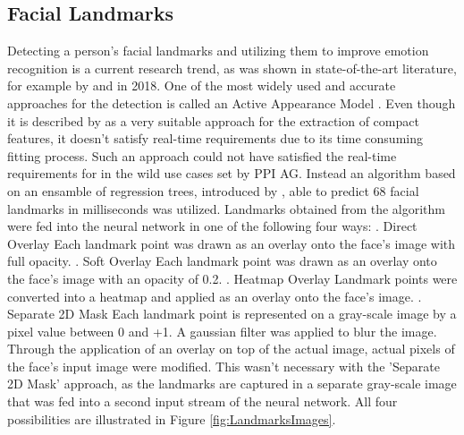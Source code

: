 \subsection{Facial Landmarks}
Detecting a person's facial landmarks and utilizing them to improve emotion recognition is a current research trend, as was shown in state-of-the-art literature, for example by \citet{Gupta:2018:FacialLandmarks-1} and \citet{Tautkute:2018:FacialLandmarks-2} in 2018. One of the most widely used and accurate approaches for the detection is called an Active Appearance Model \citep{Cootes:2001:ActiveAppearanceModel}. Even though it is described by \citet{Gao:2010:ActiveAppearanceModels} as a very suitable approach for the extraction of compact features, it doesn't satisfy real-time requirements due to its time consuming fitting process.
\newline\newline
Such an approach could not have satisfied the real-time requirements for in the wild use cases set by PPI AG. Instead an algorithm based on an ensamble of regression trees, introduced by \citet{Kazemi:2014:ShapePredictor}, able to predict 68 facial landmarks in milliseconds was utilized.
\newline\newline
Landmarks obtained from the algorithm were fed into the neural network in one of the following four ways: 
\newline{}. Direct Overlay\newline
Each landmark point was drawn as an overlay onto the face's image with full opacity.
\newline{}. Soft Overlay\newline
Each landmark point was drawn as an overlay onto the face's image with an opacity of 0.2.
\newline{}. Heatmap Overlay\newline
Landmark points were converted into a heatmap and applied as an overlay onto the face's image.
\newline{}. Separate 2D Mask\newline
Each landmark point is represented on a gray-scale image by a pixel value between 0 and +1. A gaussian filter was applied to blur the image.
\newline\newline
Through the application of an overlay on top of the actual image, actual pixels of the face's input image were modified. This wasn't necessary with the 'Separate 2D Mask' approach, as the landmarks are captured in a separate gray-scale image that was fed into a second input stream of the neural network.
\newline\newline
All four possibilities are illustrated in Figure \ref{fig:LandmarksImages}.

